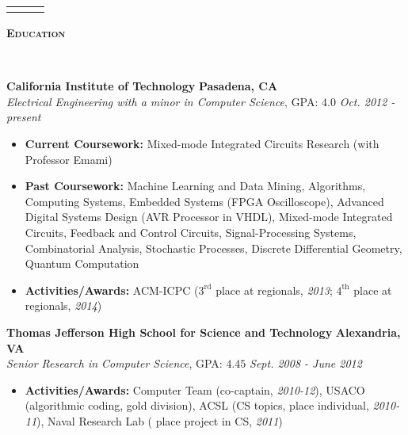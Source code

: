 \documentclass{article}
\newenvironment{changemargin}[2]{%
  \begin{list}{}{%
    \setlength{\topsep}{0pt}%
    \setlength{\leftmargin}{#1}%
    \setlength{\rightmargin}{#2}%
    \setlength{\listparindent}{\parindent}%
    \setlength{\itemindent}{\parindent}%
    \setlength{\parsep}{\parskip}%
  }%
  \item[]}{\end{list}
}
\newcommand{\lineover}{
	\begin{changemargin}{-0.05in}{-0.05in}
		\vspace*{-8pt}
		\hrulefill \\
		\vspace*{-2pt}
	\end{changemargin}
}
\newcommand{\header}[1]{
	\begin{changemargin}{-.5in}{-0.5in}
		{\large \textbf{\scshape{#1}}}\\
  	\lineover
	\end{changemargin}
}
\newcommand{\contact}[6]{
	\begin{changemargin}{1in}{1in}
		\begin{center}
			{\LARGE \scshape {#1}}\\ \smallskip
			{#4}\\ \smallskip
			{#2} \hfill {#5}\\ \smallskip
			{#3} \hfill {#6}\\ \smallskip 
		\end{center}
	\end{changemargin}
}
\newenvironment{body} {
	\vspace*{-16pt}
	\begin{changemargin}{-0.25in}{-0.5in}
  }	
	{\end{changemargin}
}
\begin{document}
\begin{changemargin}{0.5in}{0.5in}
	\begin{center}
		\begin{tabular}{ccc}
			\parbox[t]{3cm}{\hspace{1cm}} &
			\parbox[t]{5.7cm}{} &
			\parbox[t]{6cm}{}
		\end{tabular}
	\end{center}
\end{changemargin}



\header{Education}

\begin{body}
	\vspace{14pt}
	\textbf{California Institute of Technology} \hfill \textbf{Pasadena, CA} \\
	\emph{Electrical Engineering with a minor in Computer Science}, GPA: $4.0$ \hfill \emph{Oct. 2012 - present} \\
	\begin{itemize}
	\item \textbf{Current Coursework:} Mixed-mode Integrated Circuits Research (with Professor Emami)
	\item \textbf{Past Coursework:} Machine Learning and Data Mining, Algorithms, Computing Systems, Embedded Systems (FPGA Oscilloscope), Advanced Digital Systems Design (AVR Processor in VHDL), Mixed-mode Integrated Circuits, Feedback and Control Circuits, Signal-Processing Systems, Combinatorial Analysis, Stochastic Processes, Discrete Differential Geometry, Quantum Computation
	\item \textbf{Activities/Awards:} ACM-ICPC ($3^\text{rd}$ place at regionals, \textit{2013}; $4^\text{th}$ place at regionals, \textit{2014})
	\end{itemize}

	\smallskip

	\textbf{Thomas Jefferson High School for Science and Technology} \hfill \textbf{Alexandria, VA} \\
	\emph{Senior Research in Computer Science}, GPA: $4.45$ \hfill \emph{Sept. 2008 - June 2012} \\
	\begin{itemize}
	\item \textbf{Activities/Awards:} Computer Team (co-captain, \textit{2010-12}), USACO (algorithmic coding, gold division), ACSL (CS topics,  place individual, \textit{2010-11}), Naval Research Lab ( place project in CS, \textit{2011})
	\end{itemize}
\end{body}
\end{document}
